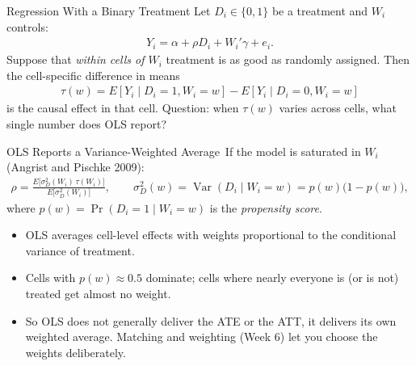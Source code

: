 \documentclass[aspectratio=169,11pt,xcolor=dvipsnames]{beamer}
\newcommand{\srcp}[1]{{\scriptsize\color{gray}(#1)}}   %
\DeclareMathOperator{\Var}{Var}
\newcommand{\E}{E}
\newcommand{\adv}{\,\raisebox{0.6pt}{\textcolor{accent}{$\bigstar$}}}
\begin{document}
\begin{frame}{Regression With a Binary Treatment}
Let $D_i\in\{0,1\}$ be a treatment and $W_i$ controls:
\begin{align*}
  Y_i = \alpha + \rho D_i + W_i'\gamma + e_i .
\end{align*}
Suppose that \emph{within cells of $W_i$} treatment is as good as randomly
assigned. Then the cell-specific difference in means
\begin{align*}
  \tau(w) = \E[Y_i \mid D_i=1, W_i=w] - \E[Y_i\mid D_i = 0, W_i = w]
\end{align*}
is the causal effect in that cell.
\vskip4pt
\alert{Question}: when $\tau(w)$ varies across cells, what single number does OLS
report?
\end{frame}

\begin{frame}{OLS Reports a Variance-Weighted Average\adv}
If the model is saturated in $W_i$ \srcp{Angrist and Pischke 2009}:
\begin{align*}
  \rho = \frac{\E\big[\sigma_D^2(W_i)\,\tau(W_i)\big]}{\E\big[\sigma_D^2(W_i)\big]},
  \qquad \sigma_D^2(w) = \Var(D_i \mid W_i = w) = p(w)\big(1-p(w)\big),
\end{align*}
where $p(w) = \Pr(D_i=1\mid W_i=w)$ is the \emph{propensity score}.
\vskip6pt
\begin{itemize}\itemsep3pt
  \item OLS averages cell-level effects with weights proportional to the
        \alert{conditional variance of treatment}.
  \item Cells with $p(w)\approx 0.5$ dominate; cells where nearly everyone is (or
        is not) treated get almost no weight.
  \item So OLS does not generally deliver the ATE or the ATT, it delivers its
        own weighted average. Matching and weighting (Week 6) let you choose the
        weights deliberately.
\end{itemize}
\end{frame}
\end{document}
